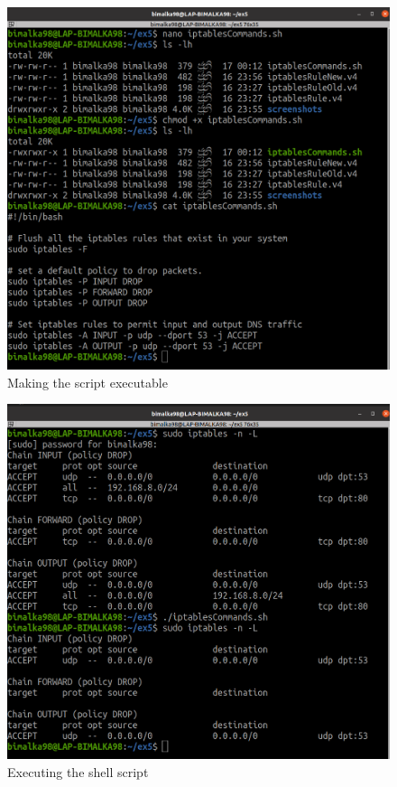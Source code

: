 \documentclass[11pt,letterpaper]{article}
\newenvironment{answer}{\em \color{blue} \begin{adjustwidth}{1cm}{1cm}}{\end{adjustwidth}}
\begin{document}
\begin{enumerate}
\begin{answer}
			\begin{figure}[H]
				\centering
				\includegraphics[width=0.65\columnwidth]{images/part1/10_2.png}
				\caption{Making the script executable}
			\end{figure}
		
			\begin{figure}[h]
				\centering
				\includegraphics[width=0.65\columnwidth]{images/part1/10_3.png}
				\caption{Executing the shell script}
			\end{figure}
		\end{answer}
		

\end{enumerate}
\end{document}
